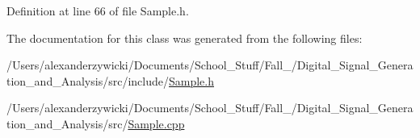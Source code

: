 Definition at line 66 of file Sample.\+h.



The documentation for this class was generated from the following files\+:\begin{DoxyCompactItemize}
\item 
/\+Users/alexanderzywicki/\+Documents/\+School\+\_\+\+Stuff/\+Fall\+\_/\+Digital\+\_\+\+Signal\+\_\+\+Generation\+\_\+and\+\_\+\+Analysis/src/include/\hyperlink{_sample_8h}{Sample.\+h}\item 
/\+Users/alexanderzywicki/\+Documents/\+School\+\_\+\+Stuff/\+Fall\+\_/\+Digital\+\_\+\+Signal\+\_\+\+Generation\+\_\+and\+\_\+\+Analysis/src/\hyperlink{_sample_8cpp}{Sample.\+cpp}\end{DoxyCompactItemize}
